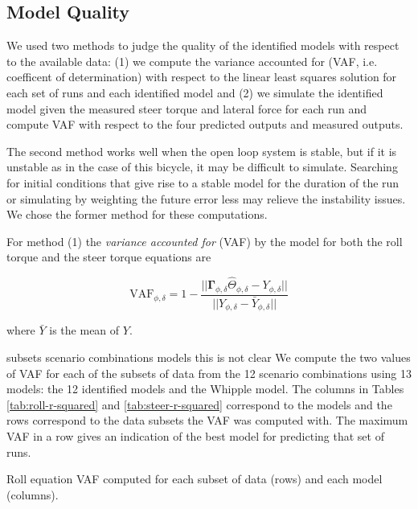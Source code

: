 \documentclass[a4paper]{article}
\begin{document}

\subsection*{Model Quality}

We used two methods to judge the quality
of the identified models with respect to the available data: (1) we compute the
variance accounted for (VAF, i.e. coefficent of determination) with respect to
the linear least squares solution for each set of runs and each identified model
and (2) we simulate the identified model given the measured steer torque and
lateral force for each run and compute VAF with respect to the four predicted
outputs and measured outputs.

The second method works well when the open loop system is stable, but if it is
unstable as in the case of this bicycle, it may be difficult to simulate.
Searching for initial conditions that give rise to a stable model for the
duration of the run or simulating by weighting the future error less may
relieve the instability issues. We chose the former method for these
computations.

For method (1) the \emph{variance accounted for} (VAF) by the model for both
the roll torque and the steer torque equations are

\begin{equation}
  \label{eq:vaf}
  \textrm{VAF}_{\phi,\delta} = 1 - \frac{\vert \vert
    \mathbf{\Gamma}_{\phi,\delta}\hat{\Theta}_{\phi,\delta} - Y_{\phi,\delta} \vert \vert}
                            {\vert \vert Y_{\phi,\delta} - \bar{Y}_{\phi,\delta} \vert \vert}
\end{equation}

where $\bar{Y}$ is the mean of $Y$.

subsets scenario  combinations  models   this is not clear
We compute the two values of VAF for each of the subsets of data from the 12
scenario combinations using 13 models: the 12 identified models and the Whipple
model. The columns in Tables \ref{tab:roll-r-squared} and
\ref{tab:steer-r-squared} correspond to the models and the rows correspond to
the data subsets the VAF was computed with. The maximum VAF in a row gives an
indication of the best model for predicting that set of runs.

\begin{table}
  \centering
  \caption{Roll equation VAF computed for each subset of data (rows)
    and each model (columns).}
  \tiny
  
  \label{tab:roll-r-squared}
\end{table}
\end{document}
